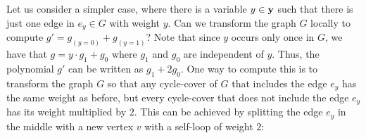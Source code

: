 Let us consider a simpler case, where there is a variable $y \in \mathbf{y}$ such that there is just one edge in $e_y \in G$ with weight $y$. 
Can we transform the graph $G$ locally to compute $g' = g_{(y=0)} + g_{(y=1)}$? 
Note that since $y$ occurs only once in $G$, we have that $g = y \cdot g_1 + g_0$ where $g_1$ and $g_0$ are independent of $y$. 
Thus, the polynomial $g'$ can be written as $g_1 + 2 g_0$. 
One way to compute this is to transform the graph $G$ so that any cycle-cover of $G$ that includes the edge $e_y$ has the same weight as before, but every cycle-cover that does not include the edge $e_y$ has its weight multiplied by $2$. 
This can be achieved by splitting the edge $e_y$ in the middle with a new vertex $v$ with a self-loop of weight $2$:


